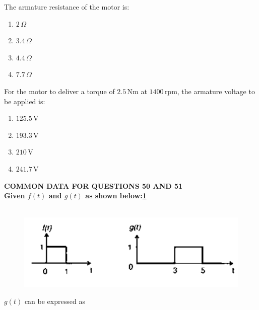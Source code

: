 \item
The armature resistance of the motor is:

\begin{multicols}{4}
\begin{enumerate}
    \item $2 \, \Omega$
    \item $3.4 \, \Omega$
    \item $4.4 \, \Omega$
    \item $7.7 \, \Omega$
\end{enumerate}
\end{multicols}

\item
For the motor to deliver a torque of $2.5 \, \text{Nm}$ at $1400 \, \text{rpm}$, the armature voltage to be applied is:

\begin{multicols}{4}
\begin{enumerate}
    \item $125.5 \, \text{V}$
    \item $193.3 \, \text{V}$
    \item $210 \, \text{V}$
    \item $241.7 \, \text{V}$
\end{enumerate}
\end{multicols}
\newpage
\textbf{COMMON DATA FOR QUESTIONS 50 AND 51}\\
\textbf{Given $f(t)$ and $g(t)$ as shown below:\ref{fig:50,51}}\\\\
\begin{figure}[!ht]
    \centering
    \includegraphics[scale=0.4]{GATE-yearwise/GATE(3)/figs/50,51.png}
    \caption{}
    \label{fig:50,51}
\end{figure}
\item $g(t)$ can be expressed as

